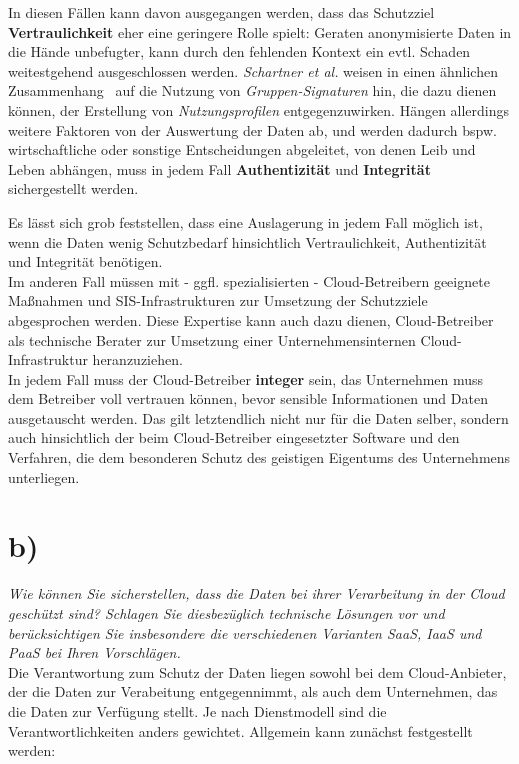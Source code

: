 \noindent
In diesen Fällen kann davon ausgegangen werden, dass das Schutzziel \textbf{Vertraulichkeit} eher eine geringere Rolle spielt:
Geraten anonymisierte Daten in die Hände unbefugter, kann durch den fehlenden Kontext ein evtl. Schaden weitestgehend ausgeschlossen werden.
\textit{Schartner et al.} weisen in einen ähnlichen Zusammenhang~\cite[62]{ITS6} auf die Nutzung von \textit{Gruppen-Signaturen} hin, die dazu dienen können, der Erstellung von \textit{Nutzungsprofilen} entgegenzuwirken.
\noindent
Hängen allerdings weitere Faktoren von der Auswertung der Daten ab, und werden dadurch bspw. wirtschaftliche oder sonstige Entscheidungen abgeleitet, von denen Leib und Leben abhängen, muss in jedem Fall \textbf{Authentizität} und \textbf{Integrität} sichergestellt werden.

\noindent
Es lässt sich grob feststellen, dass eine Auslagerung in jedem Fall möglich ist, wenn die Daten wenig Schutzbedarf hinsichtlich Vertraulichkeit, Authentizität und Integrität benötigen.\\
Im anderen Fall müssen mit - ggfl. spezialisierten - Cloud-Betreibern geeignete Maßnahmen und SIS-Infrastrukturen zur Umsetzung der Schutzziele abgesprochen werden.
Diese Expertise kann auch dazu dienen, Cloud-Betreiber als technische Berater zur Umsetzung einer Unternehmensinternen Cloud-Infrastruktur heranzuziehen.\\

\noindent
In jedem Fall muss der Cloud-Betreiber \textbf{integer} sein, das Unternehmen muss dem Betreiber voll vertrauen können, bevor sensible Informationen und Daten ausgetauscht werden.
Das gilt letztendlich nicht nur für die Daten selber, sondern auch hinsichtlich der beim Cloud-Betreiber eingesetzter Software und den Verfahren, die dem besonderen Schutz des geistigen Eigentums des Unternehmens unterliegen.

\section{b)}

\textit{Wie können Sie sicherstellen, dass die Daten bei ihrer Verarbeitung in der Cloud
geschützt sind? Schlagen Sie diesbezüglich technische Lösungen vor und berücksichtigen Sie insbesondere die verschiedenen Varianten SaaS, IaaS und PaaS bei
Ihren Vorschlägen.}\\

\noindent
Die Verantwortung zum Schutz der Daten liegen sowohl bei dem Cloud-Anbieter, der die Daten zur Verabeitung entgegennimmt, als auch dem Unternehmen, das die Daten zur Verfügung stellt.
Je nach Dienstmodell sind die Verantwortlichkeiten anders gewichtet.
Allgemein kann zunächst festgestellt werden:

